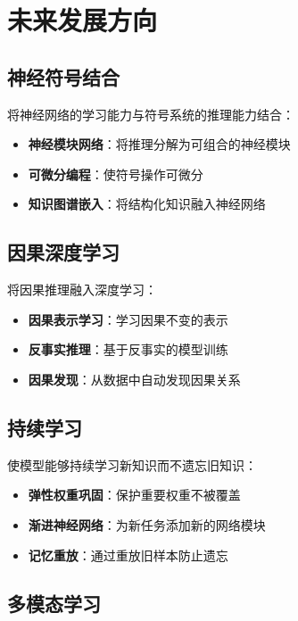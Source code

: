 \section{未来发展方向}

\subsection{神经符号结合}

将神经网络的学习能力与符号系统的推理能力结合：

\begin{itemize}
\item \textbf{神经模块网络}：将推理分解为可组合的神经模块
\item \textbf{可微分编程}：使符号操作可微分
\item \textbf{知识图谱嵌入}：将结构化知识融入神经网络
\end{itemize}

\subsection{因果深度学习}

将因果推理融入深度学习：

\begin{itemize}
\item \textbf{因果表示学习}：学习因果不变的表示
\item \textbf{反事实推理}：基于反事实的模型训练
\item \textbf{因果发现}：从数据中自动发现因果关系
\end{itemize}

\subsection{持续学习}

使模型能够持续学习新知识而不遗忘旧知识：

\begin{itemize}
\item \textbf{弹性权重巩固}：保护重要权重不被覆盖
\item \textbf{渐进神经网络}：为新任务添加新的网络模块
\item \textbf{记忆重放}：通过重放旧样本防止遗忘
\end{itemize}

\subsection{多模态学习}


